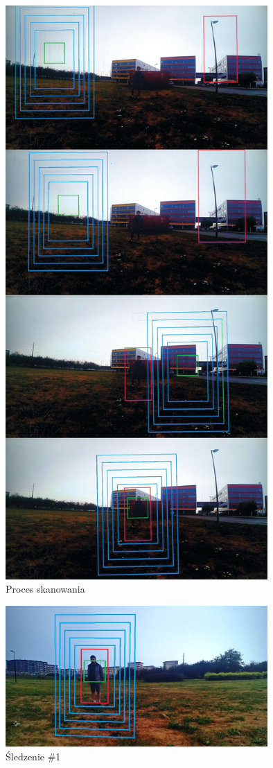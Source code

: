 \begin{figure}[h]
	\centering
	\includegraphics[width=10cm]{6_scan_1.jpg}
	\caption{Proces skanowania} %
	\label{fig:scan_screenshot}
\end{figure}

\begin{figure}[h]
	\centering
	\includegraphics[width=10cm]{6_track_1.jpg}
	\caption{Śledzenie \#1}
	\label{fig:track_1}
\end{figure}

